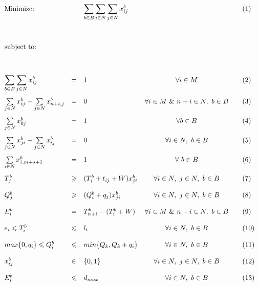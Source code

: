\documentclass{article}
\begin{document}
\begin{equation*}
\def\arraystretch{2}
\begin{array}{lllcll} %
\text{Minimize:}  && \displaystyle\sum\limits_{b \in B}\sum\limits_{i \in N}\sum\limits_{j \in N}x_{ij}^{b} && & (1)\\
	&	&	&	&	&  \\
\text{subject to:}&   &  &  & &\\
	&	&	& 	&	& \\
	 \displaystyle\sum\limits_{b \in B}\sum\limits_{j \in N}x_{ij}^{b} &=& 1 &  \forall i \in M & & (2) \\ %
	 \sum\limits_{j \in N}x_{ij}^{b} - \sum\limits_{j \in N}x_{n+i, j}^{b} &=& 0	& \forall i \in M \ \& \   n+i \in N, \ b \in B	&&  (3) \\
	 \sum\limits_{j \in N}x_{0j}^{b}&=&1	&\forall b \in B & & (4) \\
	 \sum\limits_{j \in N}x_{ji}^{b} - \sum\limits_{j \in N}x_{ij}^{b} &=& 0	& \forall i \in N, \ b \in B	&&  (5) \\
	 \sum\limits_{i \in N}x_{i,m+s+1}^{b} &=& 1	&	\forall \ b \in B& & (6) \\
	 T^{b}_{j} &\geqslant& ( T^{b}_{i}+t_{ij}+W)x_{ji}^{b} 	& \forall i \in N,\  j \in N, \ b \in B		&&  (7) \\
	 Q^{b}_{j}& \geqslant& ( Q^{b}_{i}+q_j)x_{ji}^{b} 		&\forall i \in N,\  j \in N, \ b \in B		&&  (8) \\
	 E^{b}_{i}	&=&T^{b}_{n+i} -( T^{b}_{i}+W)	&\forall i \in M \ \& \   n+i \in N, \ b \in B		& & (9) \\
	 e_i \leqslant T^{b}_{i}	&\leqslant	&  l_i	&\forall i \in N, \ b \in B	&& (10) \\
	 max\{0,q_i\} \leqslant Q^{b}_{i}&	\leqslant&min\{Q_k, Q_k + q_i\} 	&\forall i \in N, \ b \in B	&& (11) \\
	 x_{ij}^{b} &\in& \{0,1\}	&\forall i \in N,\  j \in N, \ b \in B	& & (12) \\
	 E^{b}_{i} &\leqslant	&  {d}_{max}	&\forall i \in N,\ b \in B	& & (13) \\
\end{array}
\end{equation*}
\end{document}
